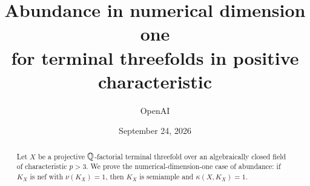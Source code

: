 \documentclass[11pt]{article}
\title{Abundance in numerical dimension one\\for terminal threefolds in positive characteristic}
\author{OpenAI}
\date{September 24, 2026}
\begin{document}
\maketitle
\begin{abstract}
Let $X$ be a projective $\mathbb Q$-factorial terminal threefold over an
algebraically closed field of characteristic $p>3$. We prove the
numerical-dimension-one case of abundance: if $K_X$ is nef with
$\nu(K_X)=1$, then $K_X$ is semiample and $\kappa(X,K_X)=1$.
\end{abstract}
\setcounter{tocdepth}{1}
\tableofcontents






\begingroup
\raggedright


\endgroup
\end{document}
